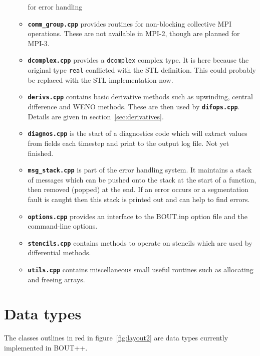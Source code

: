 \documentclass[12pt]{article}
\newcommand{\code}[1]{\texttt{#1}}
\newcommand{\file}[1]{\texttt{\bf #1}}
\begin{document}
\begin{itemize}
\begin{itemize}
    for error handling
  \item \file{comm\_group.cpp} provides routines for non-blocking collective 
    MPI operations. These are not available in MPI-2, though are planned for
    MPI-3.
  \item \file{dcomplex.cpp} provides a \code{dcomplex} complex type. It is here
    because the original type \code{real} conflicted with the STL definition.
    This could probably be replaced with the STL implementation now.
  \item \file{derivs.cpp} contains basic derivative methods such as
    upwinding, central difference and WENO methods. These are then
    used by \file{difops.cpp}. Details are given in
    section~\ref{sec:derivatives}.
  \item \file{diagnos.cpp} is the start of a diagnostics code which will extract
    values from fields each timestep and print to the output log file. Not
    yet finished.
  \item \file{msg\_stack.cpp} is part of the error handling system. It maintains
    a stack of messages which can be pushed onto the stack at the start of 
    a function, then removed (popped) at the end. If an error occurs or 
    a segmentation fault is caught then this stack is printed out and can
    help to find errors.
  \item \file{options.cpp} provides an interface to the BOUT.inp option file
    and the command-line options. 
  \item \file{stencils.cpp} contains methods to operate on stencils which are
    used by differential methods. 
  \item \file{utils.cpp} contains miscellaneous small useful routines
    such as allocating and freeing arrays.
  \end{itemize}
\end{itemize}



\section{Data types}

The classes outlines in red in figure~\ref{fig:layout2} are data types 
currently implemented in BOUT++. 
\end{document}
